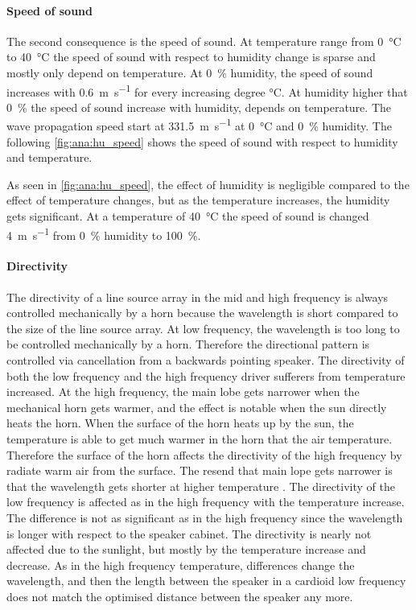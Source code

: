\paragraph{Speed of sound} The second consequence is the speed of sound. At temperature range from \SI{0}{\celsius} to \SI{40}{\celsius} the speed of sound with respect to humidity change is sparse and mostly only depend on temperature. At \SI{0}{\percent} humidity, the speed of sound increases with \SI{0.6}{\meter\per\second} for every increasing degree \si{\celsius}. At humidity higher that \SI{0}{\percent} the speed of sound increase with humidity, depends on temperature. The wave propagation speed start at \SI{331.5}{\meter\per\second} at \SI{0}{\celsius} and \SI{0}{\percent} humidity. The following \autoref{fig:ana:hu_speed} shows the speed of sound with respect to humidity and temperature. 


As seen in \autoref{fig:ana:hu_speed}, the effect of humidity is negligible compared to the effect of temperature changes, but as the temperature increases, the humidity gets significant. At a temperature of \SI{40}{\celsius} the speed of sound is changed \SI{4}{\meter\per\second} from \SI{0}{\percent} humidity to \SI{100}{\percent}. 


\paragraph{Directivity} The directivity of a line source array in the mid and high frequency is always controlled mechanically by a horn because the wavelength is short compared to the size of the line source array. At low frequency, the wavelength is too long to be controlled mechanically by a horn. Therefore the directional pattern is controlled via cancellation from a backwards pointing speaker. The directivity of both the low frequency and the high frequency driver sufferers from temperature increased. At the high frequency, the main lobe gets narrower when the mechanical horn gets warmer, and the effect is notable when the sun directly heats the horn. When the surface of the horn heats up by the sun, the temperature is able to get much warmer in the horn that the air temperature. Therefore the surface of the horn affects the directivity of the high frequency by radiate warm air from the surface. The resend that main lope gets narrower is that the wavelength gets shorter at higher temperature \citep{levine2018influence}. The directivity of the low frequency is affected as in the high frequency with the temperature increase. The difference is not as significant as in the high frequency since the wavelength is longer with respect to the speaker cabinet. The directivity is nearly not affected due to the sunlight, but mostly by the temperature increase and decrease. As in the high frequency temperature, differences change the wavelength, and then the length between the speaker in a cardioid low frequency does not match the optimised distance between the speaker any more. 



